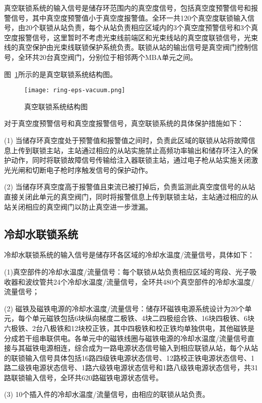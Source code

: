 真空联锁系统的输入信号是储存环范围内的真空度信号，包括真空度预警信号和报警信号，其中真空度预警值小于真空度报警值。全环一共120个真空度联锁输入信号，由20个联锁从站负责，每个从站负责相应区域内的3个真空度预警信号和3个真空度报警信号，这里暂时不考虑光束线前端区和光束线站的真空度联锁信号，光束线的真空保护由光束线联锁保护系统负责。联锁从站的输出信号是真空阀门控制信号，全环共20台真空阀门，分别位于相邻两个MBA单元之间。

图~\ref{fig:ring-eps-vacuum}所示的是真空联锁系统结构图。

\begin{figure}[!htb]
	\centering
	\texttt{[image: ring-eps-vacuum.png]}
	\caption{真空联锁系统结构图}
	\label{fig:ring-eps-vacuum}
\end{figure}

对于真空度预警信号和真空度报警信号，真空联锁系统的具体保护措施如下：

(1) 当储存环真空度处于预警值和报警值之间时，负责此区域的联锁从站将故障信息上传到联锁主站，主站通过相应的从站实施禁止高频功率输出和储存环注入的保护动作，同时将联锁故障信号传输给注入器联锁主站，通过电子枪从站实施关闭激光光闸和切断电子枪时序触发信号的保护动作。

(2) 当储存环真空度高于报警值且束流已被打掉后，负责监测此真空度信号的从站直接关闭此单元的真空阀门，同时将报警信息上传到联锁主站，主站通过相应的从站关闭相应的真空阀门以防止真空进一步泄漏。

\subsection{冷却水联锁系统}

冷却水联锁系统的输入信号是储存环各区域的冷却水温度/流量信号，具体如下：

(1)真空部件的冷却水温度/流量信号：每个联锁从站负责相应区域的弯段、光子吸收器和波纹管共24个冷却水温度/流量信号，全环共480个真空部件的冷却水温度/流量信号；

(2) 磁铁及磁铁电源的冷却水温度/流量信号：储存环磁铁电源系统设计为20个单元，每个单元磁铁包括6块纵向梯度二极铁、4块二四极组合铁、16块四极铁、6块六极铁、2台八极铁和12块校正铁，其中四极铁和校正铁均单独供电，其他磁铁是分成若干组串联供电。各单元中的磁铁线圈与磁铁电源的冷却水温度/流量信号直接与其磁铁电源相连，综合成为一路电源状态信号输入到相应联锁从站，每个从站的联锁输入信号具体包括16路四级铁电源状态信号、12路校正铁电源状态信号、1路二级铁电源状态信号、1路六级铁电源状态信号和1路八级铁电源状态信号，共31路联锁输入信号，全环共620路磁铁电源状态信号。

(3) 10个插入件的冷却水温度/流量信号，由相应的联锁从站负责。

